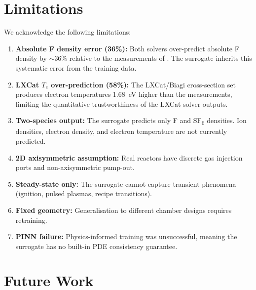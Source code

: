 \documentclass[12pt,a4paper]{article}
\begin{document}
\section{Limitations}
\label{sec:limitations}

We acknowledge the following limitations:

\begin{enumerate}
  \item \textbf{Absolute F density error (36\%):}  Both solvers
        over-predict absolute F density by $\sim$36\% relative to the
        measurements of \citet{mettler2020}.  The surrogate inherits
        this systematic error from the training data.

  \item \textbf{LXCat $T_e$ over-prediction (58\%):}  The
        LXCat/Biagi cross-section set produces electron temperatures
        \SI{1.68}{\electronvolt} higher than the
        \citet{lallement2009} measurements, limiting the quantitative
        trustworthiness of the LXCat solver outputs.

  \item \textbf{Two-species output:}  The surrogate predicts only F
        and SF\textsubscript{6} densities.  Ion densities, electron
        density, and electron temperature are not currently predicted.

  \item \textbf{2D axisymmetric assumption:}  Real reactors have
        discrete gas injection ports and non-axisymmetric pump-out.

  \item \textbf{Steady-state only:}  The surrogate cannot capture
        transient phenomena (ignition, pulsed plasmas, recipe
        transitions).

  \item \textbf{Fixed geometry:}  Generalisation to different chamber
        designs requires retraining.

  \item \textbf{PINN failure:}  Physics-informed training was
        unsuccessful, meaning the surrogate has no built-in PDE
        consistency guarantee.
\end{enumerate}

\section{Future Work}
\label{sec:future}
\end{document}
